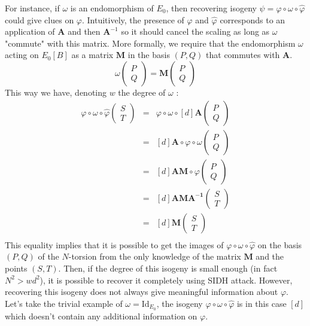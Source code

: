 \documentclass[12pt,a4paper]{article}
\begin{document}
		For instance, if $\omega$ is an endomorphism of $E_0$,
		then recovering isogeny $\psi = \varphi \circ \omega \circ \widehat\varphi$
		could give clues on $\varphi$. Intuitively, the presence of $\varphi$ and
		$\widehat\varphi$ corresponds to an application of $\mathbf A$ and then $\mathbf A^{-1}$
		so it should cancel the scaling as long as $\omega$ "commute" with this matrix.
		More formally, we require that the endomorphism $\omega$ acting on $E_0[B]$ as a matrix
		$\mathbf M$ in the basis $(P,Q)$ that commutes with $\mathbf A$.
		\[
			\omega \begin{pmatrix} P \\ Q\end{pmatrix} = \mathbf M \begin{pmatrix} P \\ Q \end{pmatrix}
		\] 
		This way we have, denoting $w$ the degree of $\omega$ :
		\begin{eqnarray*}
			\varphi\circ\omega\circ\widehat\varphi \begin{pmatrix} S \\ T \end{pmatrix}
		&=& \varphi\circ\omega\circ [d]  \mathbf A \begin{pmatrix} P \\ Q \end{pmatrix} \\
		&=& [d]\mathbf A \circ \varphi\circ\omega \begin{pmatrix} P \\ Q \end{pmatrix} \\
		&=& [d]\mathbf{AM} \circ \varphi \begin{pmatrix} P \\ Q \end{pmatrix} \\
		&=& [d]\mathbf{AMA^{-1}}  \begin{pmatrix} S \\ T \end{pmatrix} \\
		&=& [d]\mathbf{M}  \begin{pmatrix} S \\ T \end{pmatrix} \\
		\end{eqnarray*}
		This equality implies that it is possible to get the images of $\varphi\circ\omega
		\circ\widehat\varphi$ on the basis $(P,Q)$ of the $N$-torsion from the only knowledge
		of the matrix $\mathbf M$ and the points $(S,T)$. Then, if the degree of this isogeny
		is small enough (in fact $N^2>wd^2$), it is possible to recover it completely using SIDH attack. 
		However, recovering this isogeny
		does not always give meaningful information about $\varphi$. Let's take the trivial
		example of $\omega=\mathrm{Id}_{E_0}$, the isogeny $\varphi\circ\omega\circ\widehat\varphi$
		is in this case $[d]$ which doesn't contain any additional information on $\varphi$.
\end{document}
